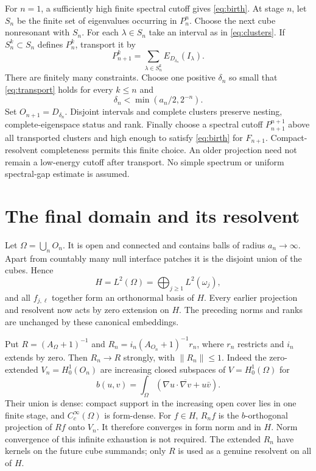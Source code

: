 \documentclass[11pt]{article}
\newcommand{\norm}[1]{\left\lVert #1\right\rVert}
\begin{document}
For $n=1$, a sufficiently high finite spectral cutoff gives
\eqref{eq:birth}. At stage $n$, let $S_n$ be the finite set of eigenvalues
occurring in $P_n^n$. Choose the next cube nonresonant with $S_n$.
For each $\lambda\in S_n$ take an interval as in \eqref{eq:clusters}.
If $S_n^k\subset S_n$ defines $P_n^k$, transport it by
\[
 P_{n+1}^k=\sum_{\lambda\in S_n^k}
                  E_{D_{\delta_n}}(I_\lambda).
\]
There are finitely many constraints. Choose one positive $\delta_n$ so
small that \eqref{eq:transport} holds for every $k\le n$ and
\[
 \delta_n<\min(a_n/2,2^{-n}).
\]
Set $O_{n+1}=D_{\delta_n}$. Disjoint intervals and complete clusters
preserve nesting, complete-eigenspace status and rank.
Finally choose a spectral cutoff $P_{n+1}^{n+1}$ above all transported
clusters and high enough to satisfy \eqref{eq:birth} for $F_{n+1}$.
Compact-resolvent completeness permits this finite choice.
An older projection need not remain a low-energy cutoff after transport.
No simple spectrum or uniform spectral-gap estimate is assumed.

\section{The final domain and its resolvent}

Let $\Omega=\bigcup_n O_n$. It is open and connected and contains balls
of radius $a_n\to\infty$. Apart from countably many null interface
patches it is the disjoint union of the cubes. Hence
\[
 H=L^2(\Omega)=\bigoplus_{j\ge1}L^2(\omega_j),
\]
and all $f_{j,\ell}$ together form an orthonormal basis of $H$.
Every earlier projection and resolvent now acts by zero extension on $H$.
The preceding norms and ranks are unchanged by these canonical embeddings.

Put $R=(A_\Omega+1)^{-1}$ and
$R_n=i_n(A_{O_n}+1)^{-1}r_n$, where $r_n$ restricts and $i_n$ extends
by zero. Then $R_n\to R$ strongly, with $\norm{R_n}\le1$.
Indeed the zero-extended $V_n=H_0^1(O_n)$ are increasing closed subspaces
of $V=H_0^1(\Omega)$ for
\[
 b(u,v)=\int_\Omega(\nabla u\cdot\overline{\nabla v}+u\bar v).
\]
Their union is dense: compact support in the increasing open cover lies
in one finite stage, and $C_c^\infty(\Omega)$ is form-dense.
For $f\in H$, $R_nf$ is the $b$-orthogonal projection of $Rf$ onto $V_n$.
It therefore converges in form norm and in $H$.
Norm convergence of this infinite exhaustion is not required.
The extended $R_n$ have kernels on the future cube summands; only $R$ is
used as a genuine resolvent on all of $H$.
\end{document}
